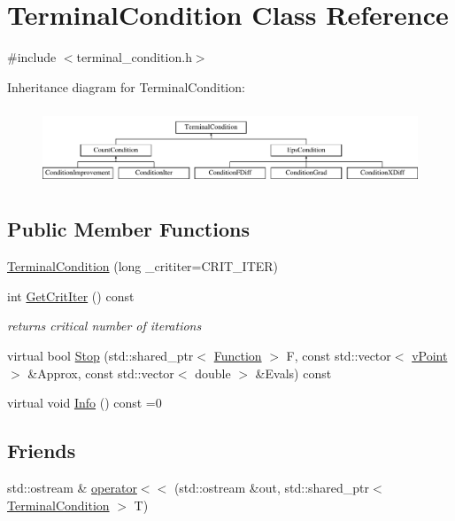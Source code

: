 \hypertarget{class_terminal_condition}{}\section{Terminal\+Condition Class Reference}
\label{class_terminal_condition}


{\ttfamily \#include $<$terminal\+\_\+condition.\+h$>$}

Inheritance diagram for Terminal\+Condition\+:\begin{figure}[H]
\begin{center}
\leavevmode
\includegraphics[height=2.333333cm]{class_terminal_condition}
\end{center}
\end{figure}
\subsection*{Public Member Functions}
\begin{DoxyCompactItemize}
\item 
\hyperlink{class_terminal_condition_a4c95c14f8dd8e7b5d6e625ff438f53d3}{Terminal\+Condition} (long \+\_\+crititer=C\+R\+I\+T\+\_\+\+I\+T\+ER)
\item 
\mbox{\label{class_terminal_condition_a824a95f1dbd4c295cdc9eee2a1f6b464}} 
int \hyperlink{class_terminal_condition_a824a95f1dbd4c295cdc9eee2a1f6b464}{Get\+Crit\+Iter} () const
\begin{DoxyCompactList}\small\item\em returns critical number of iterations \end{DoxyCompactList}\item 
virtual bool \hyperlink{class_terminal_condition_ad6294bf2bd6f5e2c6164e461c24d3198}{Stop} (std\+::shared\+\_\+ptr$<$ \hyperlink{class_function}{Function} $>$ F, const std\+::vector$<$ \hyperlink{classv_point}{v\+Point} $>$ \&Approx, const std\+::vector$<$ double $>$ \&Evals) const
\item 
virtual void \hyperlink{class_terminal_condition_a55f2460a4776875211b0a4c3b449b40f}{Info} () const =0
\end{DoxyCompactItemize}
\subsection*{Friends}
\begin{DoxyCompactItemize}
\item 
std\+::ostream \& \hyperlink{class_terminal_condition_a734331dfe86aa4863287602132c3ce97}{operator$<$$<$} (std\+::ostream \&out, std\+::shared\+\_\+ptr$<$ \hyperlink{class_terminal_condition}{Terminal\+Condition} $>$ T)
\end{DoxyCompactItemize}


